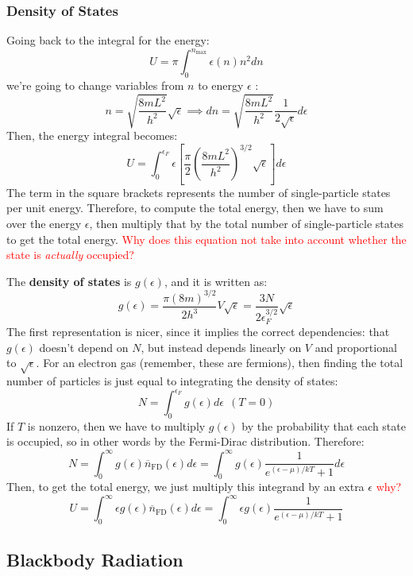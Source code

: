 \documentclass[10pt]{article}
\newcommand{\question}[1]{\textcolor{red}{#1}}
\renewcommand{\comment}[1]{\textcolor{blue!50}{#1}}
\begin{document}
	\subsubsection{Density of States} 
	Going back to the integral for the energy:
	\[
	U = \pi \int_{0}^{n_{\text{max}}} \epsilon(n) n^2 dn
	\] 
	we're going to change variables from \( n \) to energy \( \epsilon \) :
	\[
	n = \sqrt{\frac{8mL^2}{h^2}} \sqrt{\epsilon} \implies dn = \sqrt{\frac{8mL^2}{h^2}} \frac{1}{2\sqrt{\epsilon} } d\epsilon
	\] 
	Then, the energy integral becomes:
	\[
		U = \int_0^{\epsilon_F}\epsilon\left[\frac{\pi}{2}\left(\frac{8mL^2}{h^2} \right)^{3 / 2}\sqrt{\epsilon} \right] d\epsilon
	\] 
	The term in the square brackets represents the number of single-particle states per unit energy. Therefore, to compute the 
	total energy, then we have to sum over the energy \( \epsilon \), then multiply that by the 
	total number of single-particle states to get the total energy. \question{Why does this equation not take into account whether
	the state is \textit{actually} occupied?}
	
	The \textbf{density of states} is \( g(\epsilon) \), and it is written as:
	\[
	g(\epsilon) = \frac{\pi(8m)^{3 / 2}}{2h^3} V \sqrt{\epsilon}  = \frac{3N}{2 \epsilon_F^{3 / 2}}\sqrt{\epsilon} 
	\]
	The first representation is nicer, since it implies the correct dependencies: that \( g(\epsilon) \) doesn't depend on 
	\( N \), but instead depends linearly on \( V \) and proportional to \( \sqrt{\epsilon}  \). For an electron gas 
	\comment{(remember, these are fermions)}, then finding the total number of particles is just equal to 
	integrating the density of states: 
	\[
	N = \int_0^{\epsilon_F} g(\epsilon) d\epsilon \ \ (T = 0)
	\] 
	If \( T \) is nonzero, then we have to multiply \( g(\epsilon) \) by the probability that each state is occupied, so 
	in other words by the Fermi-Dirac distribution. Therefore:
	\[
	N = \int_0^{\infty}g(\epsilon) \overline n_{\text{FD}}(\epsilon) d\epsilon = 
	\int_0^{\infty}g(\epsilon) \frac{1}{e^{(\epsilon - \mu) / kT} + 1} d\epsilon
	\] 
	Then, to get the total energy, we just multiply this integrand by an extra \( \epsilon \) \question{why?}
	\[
	U = \int_0^{\infty}\epsilon g(\epsilon) \overline n_{\text{FD}}(\epsilon) d\epsilon = \int_0^{\infty}
	\epsilon g(\epsilon) \frac{1}{e^{(\epsilon - \mu) / kT} + 1}
	\] 
	\subsection{Blackbody Radiation}
\end{document}
